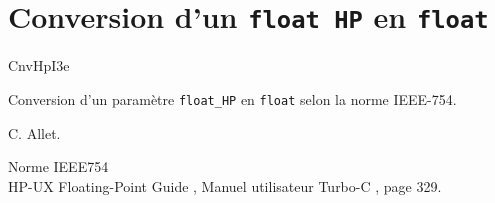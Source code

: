%
\section{Conversion d'un {\tt float HP} en {\tt float}}

 {\sf CnvHpI3e}


Conversion d'un param\`etre {\tt float\_HP} en {\tt float} selon
la norme IEEE-754.

\bigskip



%

C. Allet. 

Norme IEEE754 \cite{IEEE754}  \\ 
HP-UX Floating-Point Guide \cite{DOC-HPFLOAT},
Manuel utilisateur Turbo-C \cite{TURBO-C}, page 329.
